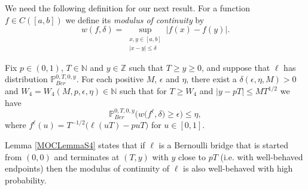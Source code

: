 We need the following definition for our next result. For a function $f \in C([a,b])$ we define its {\em modulus of continuity} by
\begin{equation}\label{MOCS4}
w(f,\delta) = \sup_{\substack{x,y \in [a,b]\\ |x-y| \leq \delta}} |f(x) - f(y)|.
\end{equation}
\begin{lemma}\label{MOCLemmaS4}Fix $p \in (0,1)$, $T \in \mathbb{N}$ and $y\in \mathbb{Z}$ such that $T \geq y \geq 0$, and suppose that $\ell$ has distribution $\mathbb{P}^{0,T,0,y}_{Ber}$. For each positive $M$, $\epsilon$ and $\eta$, there exist a $\delta(\epsilon, \eta, M) > 0$ and $W_4 = W_4(M, p, \epsilon, \eta) \in \mathbb{N}$ such that  for $T \geq W_4$ and $|y - pT| \leq MT^{1/2}$ we have
\begin{equation}\label{MOCeqS4}
\mathbb{P}^{0,T,0,y}_{Ber}\Big( w\big({f^\ell},\delta\big) \geq \epsilon \Big) \leq \eta,
\end{equation}
where $f^\ell(u) = T^{-1/2}\big(\ell(uT) - puT\big)$  for $u \in [0,1]$.
\end{lemma}
\begin{remark}
Lemma \ref{MOCLemmaS4} states that if $\ell$ is a Bernoulli bridge that is started from $(0,0)$ and terminates at $(T,y)$ with $y$ close to $pT$ (i.e. with well-behaved endpoints) then the modulus of continuity of $\ell$ is also well-behaved with high probability.
\end{remark}
